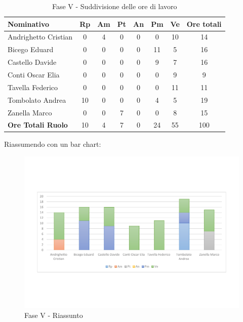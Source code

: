 \documentclass[../PianoProgetto.tex]{subfiles}
\begin{document}
	\begin{table}[h]
		\begin{tabularx}{\textwidth}{l  * {6}{C}  c}
			\toprule
			\textbf{Nominativo} & \textbf{Rp} & \textbf{Am} & \textbf{Pt} 
						& \textbf{An} & \textbf{Pm} & \textbf{Ve} & \textbf{Ore totali} \\
			\midrule
			Andrighetto Cristian & 0 & 4 & 0 & 0 & 0 & 10 & 14 \\
			Bicego Eduard & 0 & 0 &	0 &	0 &	11 & 5 & 16 \\
			Castello Davide & 0 & 0 & 0 & 0 & 9 & 7 & 16 \\
			Conti Oscar Elia &0 & 0 & 0 & 0 & 0 & 9 & 9 \\
			Tavella Federico &	0 & 0 & 0 & 0 & 0 & 11 & 11 \\
			Tombolato Andrea & 10 & 0 & 0 & 0 & 4 & 5 & 19 \\
			Zanella Marco & 0 & 0 & 7 & 0 & 0 & 8 & 15 \\
			\midrule			
			\textbf{Ore Totali Ruolo} & 10 & 4 &	7 &	0 &	24 & 55 & 100 \\
			\bottomrule
		\end{tabularx}
		\caption{Fase V - Suddivisione delle ore di lavoro}
		\label{tab:faseV_ore}
	\end{table}
\vfill	
	Riassumendo con un bar chart:
	
	\begin{figure}[!h]
		\centering
		\includegraphics[width=\textwidth , trim=2cm 5cm 2cm 5cm]{grafici/V/V-ore-persona}
			\caption{Fase V - Riassunto}
		\label{fig:BarChart-faseV_ore}
	\end{figure}
\vfill	
\newpage
\vfill
\end{document}
